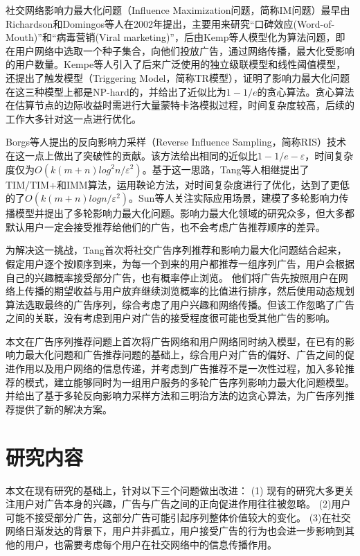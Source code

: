 社交网络影响力最大化问题（Influence Maximization问题，简称IM问题）最早由Richardson和Domingos等人\cite{richardson2002mining}在2002年提出，主要用来研究“口碑效应(Word-of-Mouth)”和“病毒营销(Viral marketing)”，后由Kemp等人\cite{kempe2003maximizing}模型化为算法问题，即在用户网络中选取一个种子集合，向他们投放广告，通过网络传播，最大化受影响的用户数量。Kempe等人引入了后来广泛使用的独立级联模型\cite{goldenberg2001talk}和线性阈值模型\cite{granovetter1978threshold}，还提出了触发模型（Triggering Model，简称TR模型），证明了影响力最大化问题在这三种模型上都是NP-hard的，并给出了近似比为$1-1/e$的贪心算法。贪心算法在估算节点的边际收益时需进行大量蒙特卡洛模拟过程，时间复杂度较高，后续的工作大多针对这一点进行优化。

Borgs等人\cite{borgs2014maximizing}提出的反向影响力采样（Reverse Influence Sampling，简称RIS）技术在这一点上做出了突破性的贡献。该方法给出相同的近似比$1-1/e-\varepsilon$，时间复杂度仅为$O(k(m+n)log^2n/\varepsilon^2)$。基于这一思路，Tang等人相继提出了TIM/TIM+\cite{tang2014influence}和IMM\cite{tang2015influence}算法，运用鞅论方法，对时间复杂度进行了优化，达到了更低的了$O(k(m+n)logn/\varepsilon^2)$。Sun等人关注实际应用场景，建模了多轮影响力传播模型并提出了多轮影响力最大化问题\cite{mrim}。影响力最大化领域的研究众多，但大多都默认用户一定会接受推荐给他们的广告，也不会考虑广告推荐顺序的差异。

为解决这一挑战，Tang\cite{tang2018social}首次将社交广告序列推荐和影响力最大化问题结合起来，假定用户逐个按顺序到来，为每一个到来的用户都推荐一组序列广告，用户会根据自己的兴趣概率接受部分广告，也有概率停止浏览。 他们将广告先按照用户在网络上传播的期望收益与用户放弃继续浏览概率的比值进行排序，然后使用动态规划算法选取最终的广告序列，综合考虑了用户兴趣和网络传播。但该工作忽略了广告之间的关联，没有考虑到用户对广告的接受程度很可能也受其他广告的影响。

本文在广告序列推荐问题上首次将广告网络和用户网络同时纳入模型，在已有的影响力最大化问题和广告推荐问题的基础上，综合用户对广告的偏好、广告之间的促进作用以及用户网络的信息传递，并考虑到广告推荐不是一次性过程，加入多轮推荐的模式，建立能够同时为一组用户服务的多轮广告序列影响力最大化问题模型。并给出了基于多轮反向影响力采样方法和三明治方法的边贪心算法，为广告序列推荐提供了新的解决方案。



\section{研究内容}

本文在现有研究的基础上，针对以下三个问题做出改进：
(1) 现有的研究大多更关注用户对广告本身的兴趣，广告与广告之间的正向促进作用往往被忽略。
(2)用户可能不接受部分广告，这部分广告可能引起序列整体价值较大的变化。
(3)在社交网络日渐发达的背景下，用户并非孤立，用户接受广告的行为也会进一步影响到其他的用户，也需要考虑每个用户在社交网络中的信息传播作用。

